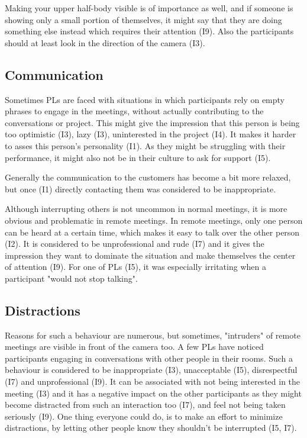 Making your upper half-body visible is of importance as well, and if someone is showing only a small portion of themselves, it might say that they are doing something else instead which requires their attention (I9). Also the participants should at least look in the direction of the camera (I3).

\subsection{Communication}

Sometimes PLs are faced with situations in which participants rely on empty phrases to engage in the meetings, without actually contributing to the conversations or project. This might give the impression that this person is being too optimistic (I3), lazy (I3), uninterested in the project (I4). It makes it harder to asses this person's personality (I1). As they might be struggling with their performance, it might also not be in their culture to ask for support (I5).

Generally the communication to the customers has become a bit more relaxed, but once (I1) directly contacting them was considered to be inappropriate.

Although interrupting others is not uncommon in normal meetings, it is more obvious and problematic in remote meetings. In remote meetings, only one person can be heard at a certain time, which makes it easy to talk over the other person (I2). It is considered to be unprofessional and rude (I7) and it gives the impression they want to dominate the situation and make themselves the center of attention (I9). For one of PLs (I5), it was especially irritating when a participant "would not stop talking".

\subsection{Distractions}

Reasons for such a behaviour are numerous, but sometimes, "intruders" of remote meetings are visible in front of the camera too. A few PLs have noticed participants engaging in conversations with other people in their rooms. Such a behaviour is considered to be inappropriate (I3), unacceptable (I5), disrespectful (I7) and unprofessional (I9). It can be associated with not being interested in the meeting (I3) and it has a negative impact on the other participants as they might become distracted from such an interaction too (I7), and feel not being taken seriously (I9). One thing everyone could do, is to make an effort to minimize distractions, by letting other people know they shouldn't be interrupted (I5, I7). 

